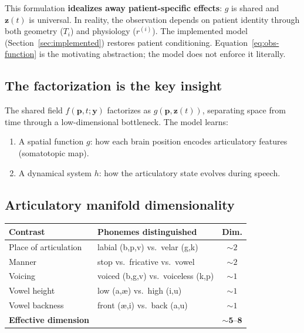 \documentclass[11pt,letterpaper]{article}
\newcommand{\bfp}{\mathbf{p}}
\newcommand{\bfz}{\mathbf{z}}
\newcommand{\bfy}{\mathbf{y}}
\begin{document}
This formulation \textbf{idealizes away patient-specific effects}: $g$ is shared and $\bfz(t)$ is universal. In reality, the observation depends on patient identity through both geometry ($T_i$) and physiology ($r^{(i)}$). The implemented model (Section~\ref{sec:implemented}) restores patient conditioning. Equation~\eqref{eq:obs-function} is the motivating abstraction; the model does not enforce it literally.

\subsection{The factorization is the key insight}

The shared field $f(\bfp, t; \bfy)$ factorizes as $g(\bfp, \bfz(t))$, separating space from time through a low-dimensional bottleneck. The model learns:
\begin{enumerate}[leftmargin=2em]
\item A spatial function $g$: how each brain position encodes articulatory features (somatotopic map).
\item A dynamical system $h$: how the articulatory state evolves during speech.
\end{enumerate}

\subsection{Articulatory manifold dimensionality}

\begin{table}[ht!]
\centering\small
\begin{tabular}{@{}llc@{}}
\toprule
\textbf{Contrast} & \textbf{Phonemes distinguished} & \textbf{Dim.} \\
\midrule
Place of articulation & labial (b,p,v) vs.\ velar (g,k) & ${\sim}2$ \\
Manner & stop vs.\ fricative vs.\ vowel & ${\sim}2$ \\
Voicing & voiced (b,g,v) vs.\ voiceless (k,p) & ${\sim}1$ \\
Vowel height & low (a,\ae) vs.\ high (i,u) & ${\sim}1$ \\
Vowel backness & front (\ae,i) vs.\ back (a,u) & ${\sim}1$ \\
\midrule
\textbf{Effective dimension} & & $\mathbf{{\sim}5\text{--}8}$ \\
\bottomrule
\end{tabular}
\end{table}
\end{document}

